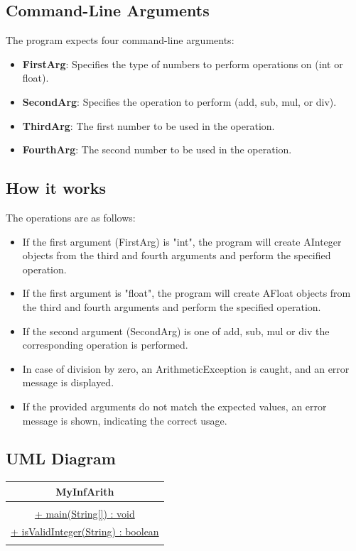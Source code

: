 \documentclass{article}
\begin{document}
\subsection*{Command-Line Arguments}
The program expects four command-line arguments:
\begin{itemize}
    \item \textbf{FirstArg}: Specifies the type of numbers to perform operations on (int or float).
    \item \textbf{SecondArg}: Specifies the operation to perform (add, sub, mul, or div).
    \item \textbf{ThirdArg}: The first number to be used in the operation.
    \item \textbf{FourthArg}: The second number to be used in the operation.
\end{itemize}

\subsection*{How it works}
The operations are as follows:
\begin{itemize}
    \item If the first argument (FirstArg) is "int", the program will create AInteger objects from the third and fourth arguments and perform the specified operation.
    \item If the first argument is "float", the program will create AFloat objects from the third and fourth arguments and perform the specified operation.
    \item If the second argument (SecondArg) is one of add, sub, mul or div the corresponding operation is performed.
    \item In case of division by zero, an ArithmeticException is caught, and an error message is displayed.
    \item If the provided arguments do not match the expected values, an error message is shown, indicating the correct usage.
\end{itemize}

\subsection*{UML Diagram}
\begin{table}[H]
\centering
\begin{tabular}{|c|}
\hline
\textbf{MyInfArith} \\
\hline
\\
\hline
\underline{+ main(String[]) : void} \\  
\underline{+ isValidInteger(String) : boolean}\\
\\
\hline
\end{tabular}
\end{table}
\newpage
\end{document}
